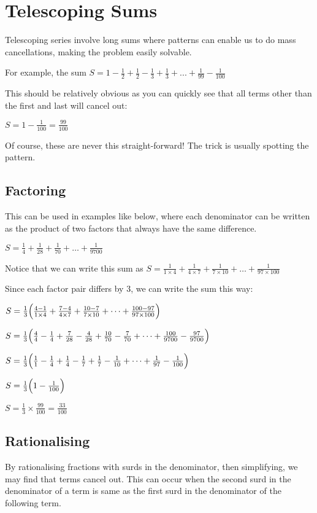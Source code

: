 \documentclass[../main.tex]{subfiles}
\begin{document}
\section{Telescoping Sums}
Telescoping series involve long sums where patterns can enable us to do mass cancellations, making the problem easily solvable.

For example, the sum $S=1-\frac{1}{2}+\frac{1}{2}-\frac{1}{3}+\frac{1}{3}+...+\frac{1}{99}-\frac{1}{100}$

This should be relatively obvious as you can quickly see that all terms other than the first and last will cancel out:

$S=1-\frac{1}{100}=\frac{99}{100}$

Of course, these are never this straight-forward! The trick is usually spotting the pattern.

\subsection*{Factoring}
This can be used in examples like below, where each denominator can be written as the product of two factors that always have the same difference.

$S=\frac{1}{4}+\frac{1}{28}+\frac{1}{70}+\dots +\frac{1}{9700}$

Notice that we can write this sum as $S=\frac{1}{1\times 4}+\frac{1}{4\times 7}+\frac{1}{7\times 10}+\dots +\frac{1}{97\times 100}$

Since each factor pair differs by 3, we can write the sum this way:

$S=\frac{1}{3}\Bigl(\frac{4-1}{1\times 4}+\frac{7-4}{4\times 7}+\frac{10-7}{7\times 10}+\dots +\frac{100-97}{97\times 100}\Bigr)$

$S=\frac{1}{3}\Bigl(\frac{4}{4}-\frac{1}{4}+\frac{7}{28}-\frac{4}{28}+\frac{10}{70}-\frac{7}{70}+\dots +\frac{100}{9700}-\frac{97}{9700}\Bigr)$

$S=\frac{1}{3}\Bigl(\frac{1}{1}-\frac{1}{4}+\frac{1}{4}-\frac{1}{7}+\frac{1}{7}-\frac{1}{10}+\dots +\frac{1}{97}-\frac{1}{100}\Bigr)$

$S=\frac{1}{3}\Bigl(1-\frac{1}{100}\Bigr)$

$S=\frac{1}{3}\times \frac{99}{100}=\frac{33}{100}$

\subsection*{Rationalising}
By rationalising fractions with surds in the denominator, then simplifying, we may find that terms cancel out. This can occur when the second surd in the denominator of a term is same as the first surd in the denominator of the following term.
\end{document}
